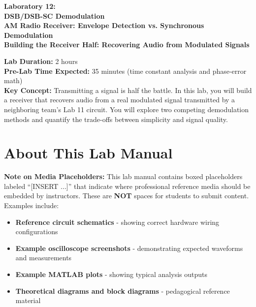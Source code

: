 \documentclass[11pt,letterpaper]{article}
\begin{document}
\begin{center}
\huge{\bf Laboratory 12:}\\
\vspace{0.2in}
\Large{\bf DSB/DSB-SC Demodulation}\\
\Large{\bf AM Radio Receiver: Envelope Detection vs. Synchronous Demodulation}\\
\vspace{0.2in}
\normalsize{\bf Building the Receiver Half: Recovering Audio from Modulated Signals}
\end{center}

\vspace{0.3in}
\noindent
\textbf{Lab Duration:} 2 hours\\
\textbf{Pre-Lab Time Expected:} 35 minutes (time constant analysis and phase-error math)\\
\textbf{Key Concept:} Transmitting a signal is half the battle. In this lab, you will build a receiver that recovers audio from a real modulated signal transmitted by a neighboring team's Lab 11 circuit. You will explore two competing demodulation methods and quantify the trade-offs between simplicity and signal quality.

\tableofcontents
\clearpage

\section*{About This Lab Manual}

\textbf{Note on Media Placeholders:} This lab manual contains boxed placeholders labeled ``[INSERT ...]'' that indicate where professional reference media should be embedded by instructors. These are \textbf{NOT} spaces for students to submit content. Examples include:

\begin{itemize}
    \item \textbf{Reference circuit schematics} - showing correct hardware wiring configurations
    \item \textbf{Example oscilloscope screenshots} - demonstrating expected waveforms and measurements
    \item \textbf{Example MATLAB plots} - showing typical analysis outputs
    \item \textbf{Theoretical diagrams and block diagrams} - pedagogical reference material
\end{itemize}
\end{document}
